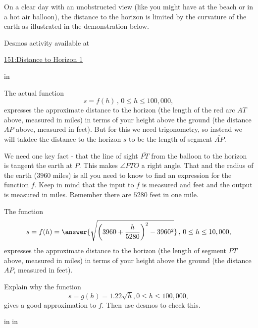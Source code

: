 \documentclass{ximera}
\newcommand{\pskip}{\vskip 0.1 in}
\begin{document}
\begin{question}  \label{Qdfthhrhghgr}
On a clear day with an unobstructed view (like you might have at the beach or in a hot air balloon), the distance to the horizon is limited by the curvature of the earth as illustrated in the demonstration below.

 
\begin{onlineOnly}
    \begin{center}
\end{center}
\end{onlineOnly}

Desmos activity available at

\href{https://www.desmos.com/calculator/ewowig5sgk}{151:Distance to Horizon 1}

\pskip

The actual function 
\[
        s= f(h) \, , \, 0\leq h \leq 100,000 ,
\]
expresses the approximate distance to the horizon (the length of the red arc $AT$ above, measured in miles) in terms of your height above the ground (the distance $AP$ above, measured in feet). But for this we need trigonometry, so instead we will takdee the distance to the horizon $s$ to be the length of segment $\overline{AP}$.

We need one key fact - that the line of sight $\overline{PT}$ from the balloon to the horizon is tangent the earth at $P$. This makes $\angle PTO$ a right angle. That and the radius of the earth ($3960$ miles) is all you need to know to find an expression for the function $f$. Keep in mind that the input to $f$ is measured and feet and the output is measured in miles. Remember there are $5280$ feet in one mile.

The function
\[
        s= f(h)  = \answer{\sqrt{\left( 3960 + \frac{h}{5280}\right)^2 - 3960^2}}   \, , \, 0\leq h \leq 10,000 ,
\]
expresses the approximate distance to the horizon (the length of segment $\overline{PT}$ above, measured in miles) in terms of your height above the ground (the distance $AP$, measured in feet).


Explain why the function
\[
      s = g(h) =  1.22\sqrt{h}, 0\leq h \leq 100,000 ,
\]
gives a good approximation to $f$. Then use desmos to check this.


\pskip \pskip




\end{question}
\end{document}
